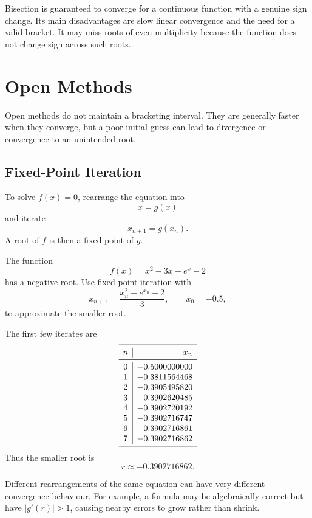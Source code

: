 Bisection is guaranteed to converge for a continuous function with a genuine sign change.  Its main disadvantages are slow linear convergence and the need for a valid bracket.  It may miss roots of even multiplicity because the function does not change sign across such roots.

\section{Open Methods}

Open methods do not maintain a bracketing interval.  They are generally faster when they converge, but a poor initial guess can lead to divergence or convergence to an unintended root.

\subsection{Fixed-Point Iteration}

To solve $f(x)=0$, rearrange the equation into
\[
 x=g(x)
\]
and iterate
\[
 x_{n+1}=g(x_n).
\]
A root of $f$ is then a fixed point of $g$.

\begin{example}
The function
\[
 f(x)=x^2-3x+e^x-2
\]
has a negative root.  Use fixed-point iteration with
\[
 x_{n+1}=\frac{x_n^2+e^{x_n}-2}{3},
 \qquad x_0=-0.5,
\]
to approximate the smaller root.
\end{example}

\begin{solution}[6.0cm]
The first few iterates are
\[
\begin{array}{c|r}
\toprule
n&x_n\\
\midrule
0&-0.5000000000\\
1&-0.3811564468\\
2&-0.3905495820\\
3&-0.3902620485\\
4&-0.3902720192\\
5&-0.3902716747\\
6&-0.3902716861\\
7&-0.3902716862\\
\bottomrule
\end{array}
\]
Thus the smaller root is
\[
 r\approx-0.3902716862.
\]
\end{solution}

Different rearrangements of the same equation can have very different convergence behaviour.  For example, a formula may be algebraically correct but have $|g'(r)|>1$, causing nearby errors to grow rather than shrink.

